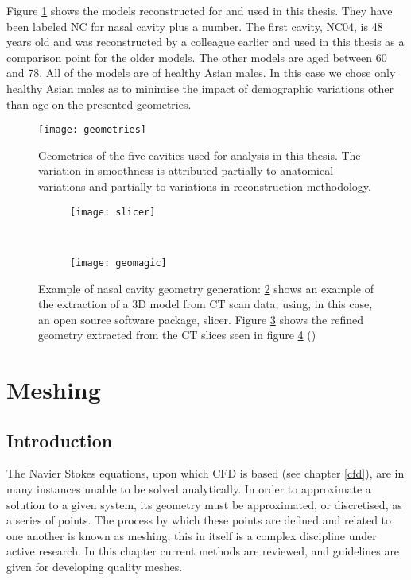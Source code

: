 Figure \ref{fig:geo} shows the models reconstructed for and used in this thesis. They have been labeled NC for nasal cavity plus a number. The first cavity, NC04, is 48 years old and was reconstructed by a colleague earlier and used in this thesis as a comparison point for the older models. The other models are aged between 60 and 78. All of the models are of healthy Asian males. In this case we chose only healthy Asian males as to minimise the impact of demographic variations other than age on the presented geometries.

\begin{figure} 
  \texttt{[image: geometries]}
  \caption{Geometries of the five cavities used for analysis in this thesis. The variation in smoothness is attributed partially to anatomical variations and partially to variations in reconstruction methodology.}
  \label{fig:geo}

\end{figure}
\begin{figure}[t!]

  \begin{subfigure}[t]{0.5\textwidth} 
    \texttt{[image: slicer]}
    \caption{}
    \label{fig:slicer}
  \end{subfigure}%
  ~ %
  \begin{subfigure}[t]{0.5\textwidth} 
    \texttt{[image: geomagic]}
    \caption{}
    \label{fig:geomag}
  \end{subfigure}

  \caption{Example of nasal cavity geometry generation: \ref{fig:slicer} shows an example of the extraction of a 3D model from CT scan data, using, in this case, an open source software package, slicer. Figure \ref{fig:geomag} shows the refined geometry extracted from the CT slices seen in figure \ref{fig:cavzamp} ()}
  \label{fig:cavzamp}
\end{figure}
 
\section{Meshing} \label{Meshing}
\subsection{Introduction}

The Navier Stokes equations, upon which CFD is based (see chapter \ref{cfd}), are in many instances unable to be solved analytically. In order to approximate a solution to a given system, its geometry must be approximated, or discretised, as a series of points. The process by which these points are defined and related to one another is known as meshing; this in itself is a complex discipline under active research. In this chapter current methods are reviewed, and guidelines are given for developing quality meshes.
